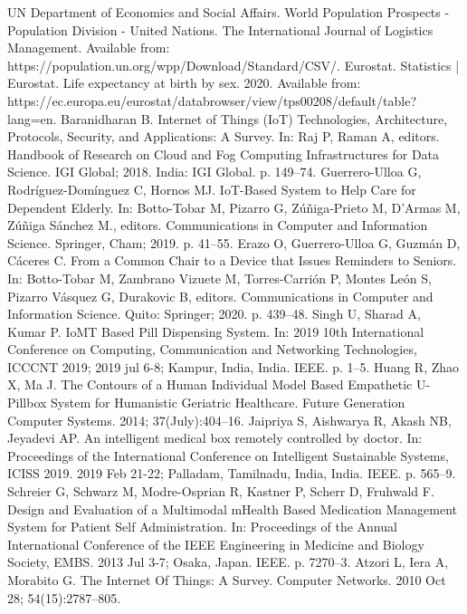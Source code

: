 \documentclass{IOS-Book-Article}
\begin{document}
\begin{thebibliography}{99}
UN Department of Economics and Social Affairs. World Population Prospects - Population Division - United Nations. The International Journal of Logistics Management. Available from: https://population.un.org/wpp/Download/Standard/CSV/.
Eurostat. Statistics | Eurostat. Life expectancy at birth by sex. 2020. Available from: https://ec.europa.eu/eurostat/databrowser/view/tps00208/default/table?lang=en.
Baranidharan B. Internet of Things (IoT) Technologies, Architecture, Protocols, Security, and Applications: A Survey. In: Raj P, Raman A, editors. Handbook of Research on Cloud and Fog Computing Infrastructures for Data Science. IGI Global; 2018. India: IGI Global. p. 149–74.
Guerrero-Ulloa G, Rodríguez-Domínguez C, Hornos MJ. IoT-Based System to Help Care for Dependent Elderly. In: Botto-Tobar M, Pizarro G, Zúñiga-Prieto M, D’Armas M, Zúñiga Sánchez M., editors. Communications in Computer and Information Science. Springer, Cham; 2019. p. 41–55.
Erazo O, Guerrero-Ulloa G, Guzmán D, Cáceres C. From a Common Chair to a Device that Issues Reminders to Seniors. In: Botto-Tobar M, Zambrano Vizuete M, Torres-Carrión P, Montes León S, Pizarro Vásquez G, Durakovic B, editors. Communications in Computer and Information Science. Quito: Springer; 2020. p. 439–48.
Singh U, Sharad A, Kumar P. IoMT Based Pill Dispensing System. In: 2019 10th International Conference on Computing, Communication and Networking Technologies, ICCCNT 2019; 2019 jul 6-8; Kampur, India, India. IEEE. p. 1–5. 
Huang R, Zhao X, Ma J. The Contours of a Human Individual Model Based Empathetic U-Pillbox System for Humanistic Geriatric Healthcare. Future Generation Computer Systems. 2014; 37(July):404–16.
Jaipriya S, Aishwarya R, Akash NB, Jeyadevi AP. An intelligent medical box remotely controlled by doctor. In: Proceedings of the International Conference on Intelligent Sustainable Systems, ICISS 2019. 2019 Feb 21-22; Palladam, Tamilnadu, India, India. IEEE. p. 565–9.
Schreier G, Schwarz M, Modre-Osprian R, Kastner P, Scherr D, Fruhwald F. Design and Evaluation of a Multimodal mHealth Based Medication Management System for Patient Self Administration. In: Proceedings of the Annual International Conference of the IEEE Engineering in Medicine and Biology Society, EMBS. 2013 Jul 3-7; Osaka, Japan. IEEE. p. 7270–3.
Atzori L, Iera A, Morabito G. The Internet Of Things: A Survey. Computer Networks. 2010 Oct 28; 54(15):2787–805.

\end{thebibliography}
\end{document}
